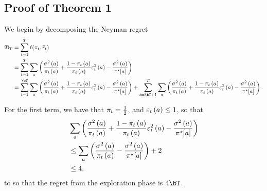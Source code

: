     \subsection{Proof of Theorem 1}
        We begin by decomposing the Neyman regret
        \begin{align}
            \neymanRegret_{\numRounds} 
                &= \sum_{\round = 1}^{\numRounds} \neymanLoss(\policy[\round], \predReward[\round]) \\
                &= \sum_{\round = 1}^{\numRounds} \sum_{\aidx} \paren{
                        \frac{\var[\aidx]}{\policy[\round][\aidx]} 
                        + \frac{1 - \policy[\round][\aidx]}{\policy[\round][\aidx]}\predRewardError[\round][\aidx][2] 
                        - \frac{\var[\aidx]}{\neymanPolicy[\aidx]}
                } \\
                &= \sum_{\round = 1}^{\exploreTime} \sum_{\aidx} \paren{
                        \frac{\var[\aidx]}{\policy[\round][\aidx]} 
                        + \frac{1 - \policy[\round][\aidx]}{\policy[\round][\aidx]}\predRewardError[\round][\aidx][2] 
                        - \frac{\var[\aidx]}{\neymanPolicy[\aidx]}
                    }
                    + \sum_{\round = \exploreTime + 1}^{\numRounds} \sum_{\aidx} \paren{
                        \frac{\var[\aidx]}{\policy[\round][\aidx]} 
                        + \frac{1 - \policy[\round][\aidx]}{\policy[\round][\aidx]}\predRewardError[\round][\aidx][2] 
                        - \frac{\var[\aidx]}{\neymanPolicy[\aidx]}
                    }.
        \end{align}
        
        For the first term, we have that $\policy_\round = \frac{1}{2}$, and $\predRewardError[\round][\aidx] \leq 1$, so that
        \begin{align}
            &\sum_{\aidx} \paren{
                        \frac{\var[\aidx]}{\policy[\round][\aidx]} 
                        + \frac{1 - \policy[\round][\aidx]}{\policy[\round][\aidx]}\predRewardError[\round][\aidx][2] 
                        - \frac{\var[\aidx]}{\neymanPolicy[\aidx]}
                    } \\
            &\leq \sum_{\aidx} \paren{
                        \frac{\var[\aidx]}{\policy[\round][\aidx]} 
                        - \frac{\var[\aidx]}{\neymanPolicy[\aidx]}
                    } + 2 \\
            &\leq 4,
        \end{align}
        to so that the regret from the exploration phase is $4 \exploreTime$.
        
